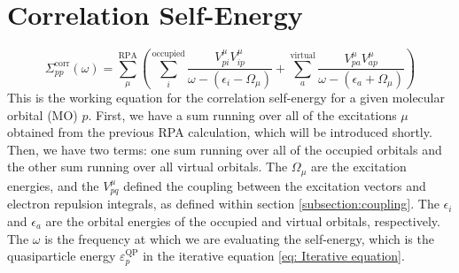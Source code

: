 \documentclass[12pt]{caltech_thesis}
\begin{document}
\section{Correlation Self-Energy}
\label{sec:correlation_self_energy}
\begin{equation}
    \Sigma_{pp}^{\text{corr}}(\omega) = \sum_{\mu }^{\text{RPA}}\left(\sum_{i}^{\text{occupied}} \frac{V_{pi}^{\mu }V_{ip}^{\mu }}{\omega -(\epsilon _{i}-\Omega  _{\mu })}+ \sum_{a}^{\text{virtual}} \frac{V_{pa}^{\mu }V_{ap}^{\mu }}{\omega -(\epsilon _{a}+\Omega  _{\mu })}\right)
\end{equation}
This is the working equation for the correlation self-energy for a given molecular orbital (MO) $p$. First, we have a sum running over all of the excitations $\mu$ obtained from the previous RPA calculation, which will be introduced shortly. Then, we have two terms: one sum running over all of the occupied orbitals and the other sum running over all virtual orbitals. The $\Omega _{\mu }$ are the excitation energies, and the $V_{pq}^{\mu }$ defined the coupling between the excitation vectors and electron repulsion integrals, as defined within section \ref{subsection:coupling}. The $\epsilon _{i}$ and $\epsilon _{a}$ are the orbital energies of the occupied and virtual orbitals, respectively. The $\omega$ is the frequency at which we are evaluating the self-energy, which is the quasiparticle energy $\varepsilon_{p}^{\text{QP}}$ in the iterative equation \ref{eq: Iterative equation}.
\end{document}
